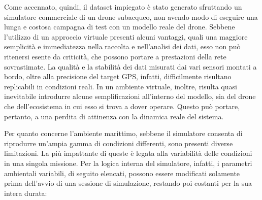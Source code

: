 Come accennato, quindi, il dataset impiegato è stato generato sfruttando un simulatore commerciale di un drone subacqueo, non avendo modo di eseguire una lunga e costosa campagna di test con un modello reale del drone. Sebbene l'utilizzo di un approccio virtuale presenti alcuni vantaggi, quali una maggiore semplicità e immediatezza nella raccolta e nell'analisi dei dati, esso non può ritenersi esente da criticità, che possono portare a prestazioni della rete sovrastimate. La qualità e la stabilità dei dati misurati dai vari sensori montati a bordo, oltre alla precisione del target GPS, infatti, difficilmente risultano replicabili in condizioni reali. In un ambiente virtuale, inoltre, risulta quasi inevitabile introdurre alcune semplificazioni all'interno del modello, sia del drone che dell'ecosistema in cui esso si trova a dover operare. Questo può portare, pertanto, a una perdita di attinenza con la dinamica reale del sistema. 

Per quanto concerne l'ambiente marittimo, sebbene il simulatore consenta di riprodurre un'ampia gamma di condizioni differenti, sono presenti diverse limitazioni. La più impattante di queste è legata alla variabilità delle condizioni in una singola missione. Per la logica interna del simulatore, infatti, i parametri ambientali variabili, di seguito elencati, possono essere modificati solamente prima dell'avvio di una sessione di simulazione, restando poi costanti per la sua intera durata:  

